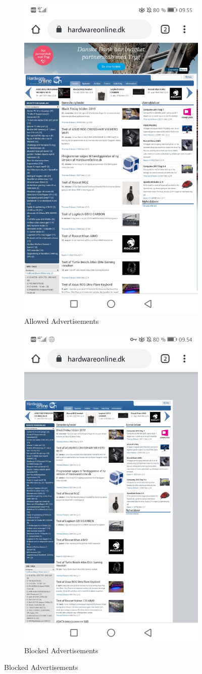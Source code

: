 \documentclass[main.tex]{subfiles}
\begin{document}
\begin{figure}[H]
    \begin{subfigure}{.5\textwidth}
        \centering
        \includegraphics[width=.6\linewidth]{Images/Evaluation/ads-com-android-chrome.jpg}
        \caption{Allowed Advertisements}
        \label{fig:ads-hol}
    \end{subfigure}
    \begin{subfigure}{.5\textwidth}
        \centering
        \includegraphics[width=.6\linewidth]{Images/Evaluation/no-ads-com-android-chrome.jpg}
        \caption{Blocked Advertisements}
        \label{fig:no-ads-hol}
    \end{subfigure}
\end{figure}
\end{document}
